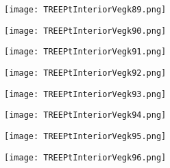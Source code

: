 \documentclass[pdf]{beamer}
\begin{document}
\begin{frame}
\begin{figure}[!h]
\centering
\texttt{[image: TREEPtInteriorVegk89.png]}
\end{figure}
\end{frame}

\begin{frame}
\begin{figure}[!h]
\centering
\texttt{[image: TREEPtInteriorVegk90.png]}
\end{figure}
\end{frame}

\begin{frame}
\begin{figure}[!h]
\centering
\texttt{[image: TREEPtInteriorVegk91.png]}
\end{figure}
\end{frame}

\begin{frame}
\begin{figure}[!h]
\centering
\texttt{[image: TREEPtInteriorVegk92.png]}
\end{figure}
\end{frame}

\begin{frame}
\begin{figure}[!h]
\centering
\texttt{[image: TREEPtInteriorVegk93.png]}
\end{figure}
\end{frame}

\begin{frame}
\begin{figure}[!h]
\centering
\texttt{[image: TREEPtInteriorVegk94.png]}
\end{figure}
\end{frame}

\begin{frame}
\begin{figure}[!h]
\centering
\texttt{[image: TREEPtInteriorVegk95.png]}
\end{figure}
\end{frame}

\begin{frame}
\begin{figure}[!h]
\centering
\texttt{[image: TREEPtInteriorVegk96.png]}
\end{figure}
\end{frame}
\end{document}
